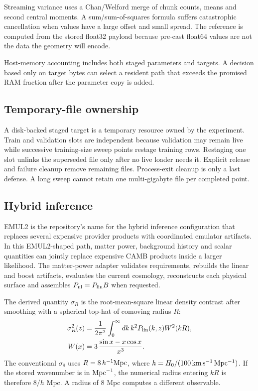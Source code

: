 \documentclass[10pt,aps,prd,twocolumn,nofootinbib]{revtex4-2}
\begin{document}
Streaming variance uses a Chan/Welford merge of chunk counts, means and
second central moments.  A sum/sum-of-squares formula suffers catastrophic
cancellation when values have a large offset and small spread.  The reference
is computed from the stored float32 payload because pre-cast float64 values
are not the data the geometry will encode.

Host-memory accounting includes both staged parameters and targets.  A
decision based only on target bytes can select a resident path that exceeds
the promised RAM fraction after the parameter copy is added.

\subsection{Temporary-file ownership}

A disk-backed staged target is a temporary resource owned by the experiment.
Train and validation slots are independent because validation may remain live
while successive training-size sweep points restage training rows.  Restaging
one slot unlinks the superseded file only after no live loader needs it.
Explicit release and failure cleanup remove remaining files.  Process-exit
cleanup is only a last defense.  A long sweep cannot retain one multi-gigabyte
file per completed point.

\subsection{Hybrid inference}

EMUL2 is the repository's name for the hybrid inference configuration that
replaces several expensive provider products with coordinated emulator
artifacts.  In this EMUL2-shaped path, matter power, background history and scalar
quantities can jointly replace expensive CAMB products inside a larger
likelihood.  The matter-power adapter validates requirements, rebuilds the
linear and boost artifacts, evaluates the current cosmology, reconstructs each
physical surface and assembles \(P_{\rm nl}=P_{\rm lin}B\) when requested.

The derived quantity $\sigma_R$ is the root-mean-square linear density
contrast after smoothing with a spherical top-hat of comoving radius $R$:
\begin{align*}
 \sigma_R^2(z)&=\frac{1}{2\pi^2}
 \int_0^\infty dk\,k^2P_{\rm lin}(k,z)W^2(kR),\\
 W(x)&=3\,\frac{\sin x-x\cos x}{x^3}.
\end{align*}
The conventional $\sigma_8$ uses $R=8\,h^{-1}{\rm Mpc}$, where
$h=H_0/(100\,{\rm km\,s^{-1}\,Mpc^{-1}})$.  If the stored wavenumber is in
${\rm Mpc}^{-1}$, the numerical radius entering $kR$ is therefore
$8/h$ Mpc.  A radius of 8 Mpc computes a different observable.
\end{document}
